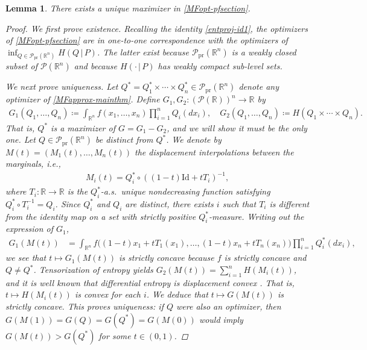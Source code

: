 \documentclass[11pt,reqno]{amsart}
\numberwithin{equation}{section}
\newtheorem{lemma}[theorem]{Lemma}
\theoremstyle{definition}
\def\R{{\mathbb R}}
\def\P{{\mathcal P}}
\def\Pprod{\P_{\mathrm{pr}}}
\begin{document}
\begin{lemma} \label{lem: maximizer unique}
There exists a unique  maximizer in \eqref{MFopt-pfsection}. 
\begin{proof}
We first prove existence. Recalling the identity \eqref{entproj-id1}, the optimizers of \eqref{MFopt-pfsection} are in one-to-one correspondence with the optimizers of $\inf_{Q \in \Pprod(\R^n)} H(Q\,|\,P)$. The latter exist because $\Pprod(\R^n)$ is a weakly closed subset of $\P(\R^n)$ and because $H(\cdot\,|\,P)$ has weakly compact sub-level sets.


		We next prove uniqueness. Let $Q^*=Q^*_1\times \cdots \times Q^*_n\in\Pprod(\R^n)$ denote any optimizer of \eqref{MFapprox-mainthm}.
		Define $G_1, G_2: (\P(\R))^n \to \R $ by 
		\begin{align*}
			G_1(Q_1, \dots, Q_n) \coloneqq \int_{\R^n} f(x_1, \dots, x_n) \prod_{i=1}^{n} Q_i(dx_i), \quad  G_2(Q_1, \dots, Q_n) \coloneqq H(Q_1 \times \cdots \times Q_n).
		\end{align*}
		That is, $Q^*$ is a maximizer of $G=G_1-G_2$, and we will show it must be the only one.
		Let $ Q  \in \Pprod(\R^n) $ be distinct from $Q^*$. We denote by $ M(t) = (M_1(t), \dots, M_n(t)) $ the displacement interpolations between the marginals, i.e.,
		\begin{align*}
			M_i(t) = Q^*_i \circ ((1-t) \mathrm{Id} + t T_i)^{-1}, 
		\end{align*}
		where $T_i : \R \to \R $ is the $ Q_i^* $-a.s.\ unique nondecreasing function satisfying  $ Q^*_i \circ T_i^{-1} = Q_i$. Since $Q^*_i$ and $Q_i$ are distinct, there exists $i$ such that $T_i$ is different from the identity map on a set with strictly positive $ Q^\ast_i$-measure.
		Writing out the expression of $G_1$,
		\begin{align*}
			G_1(M(t)) %
			&= \int_{\R^n} f\Big((1-t)x_1 + t T_1(x_1), \dots, (1-t)x_n + t T_n(x_n)\Big) \prod_{i=1}^{n} Q^*_i(dx_i),
		\end{align*}
		we see that $t \mapsto G_1(M(t))$ is strictly concave because $ f $ is strictly concave and $ Q \neq Q^*$. 
		Tensorization of entropy yields $ G_2(M(t))=\sum_{i=1}^nH(M_i(t))$, and it is well known that differential entropy is displacement convex \cite[Theorem 5.15(i)]{villani2003topics}. That is, $t\mapsto H(M_i(t))$ is convex for each $i$. We deduce that $t \mapsto G(M(t))$  is strictly concave. This proves uniqueness: if $Q$ were also an optimizer, then $G(M(1))=G(Q)=G(Q^*)=G(M(0))$ would imply $G(M(t)) > G(Q^*)$ for some $t \in (0,1)$.
\end{proof}
\end{lemma}	
\end{document}
